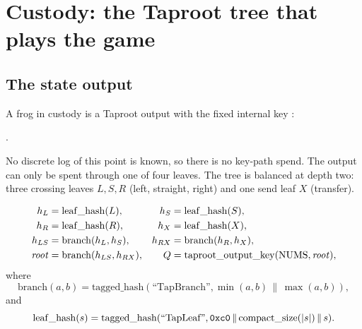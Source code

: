 \section{Custody: the Taproot tree that plays the game}\label{sec:custody}

\subsection{The state output}

A frog in custody is a Taproot output with the fixed internal key
:
\begin{center}
\footnotesize{}.
\end{center}
No discrete log of this point is known, so there is no key-path spend. The
output can only be spent through one of four leaves. The tree is balanced at
depth two: three crossing leaves $L,S,R$ (left, straight, right) and one send
leaf $X$ (transfer).

\begin{align}
h_L&=\mathrm{leaf\_hash}(L), & h_S&=\mathrm{leaf\_hash}(S),\notag\\
h_R&=\mathrm{leaf\_hash}(R), & h_X&=\mathrm{leaf\_hash}(X),\notag\\
h_{LS}&=\mathrm{branch}(h_L,h_S), & h_{RX}&=\mathrm{branch}(h_R,h_X),\notag\\
\mathit{root}&=\mathrm{branch}(h_{LS},h_{RX}), & Q&=\mathrm{taproot\_output\_key}(\text{NUMS},\mathit{root}),\notag
\end{align}
where
\begin{equation}
\mathrm{branch}(a,b)=\mathrm{tagged\_hash}(\text{``TapBranch''},
  \min(a,b)\,\|\,\max(a,b)),
\end{equation}
and
\begin{equation}
\mathrm{leaf\_hash}(s)=\mathrm{tagged\_hash}(\text{``TapLeaf''},
  \text{\code{0xc0}}\,\|\,\mathrm{compact\_size}(|s|)\,\|\,s).
\end{equation}

